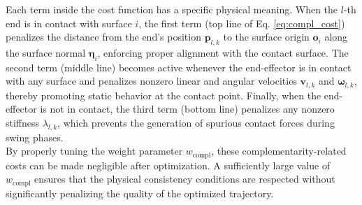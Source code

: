 \documentclass[main.tex]{subfiles}
\begin{document}
\begin{sloppypar}
\newline
Each term inside the cost function has a specific physical meaning. When the $l$-th end is in contact with surface $i$, the first term (top line of Eq. \ref{eq:compl_cost}) penalizes the distance from the end’s position $\mathbf{p}_{l,k}$ to the surface origin $\mathbf{o}_i$ along the surface normal $\boldsymbol{\eta}_i$, enforcing proper alignment with the contact surface. The second term (middle line) becomes active whenever the end-effector is in contact with any surface and penalizes nonzero linear and angular velocities $\mathbf{v}_{l,k}$ and $\boldsymbol{\omega}_{l,k}$, thereby promoting static behavior at the contact point. Finally, when the end-effector is not in contact, the third term (bottom line) penalizes any nonzero stiffness $\lambda_{l,k}$, which prevents the generation of spurious contact forces during swing phases. \\
By properly tuning the weight parameter $w_{\text{compl}}$, these complementarity-related costs can be made negligible after optimization. A sufficiently large value of $w_{\text{compl}}$ ensures that the physical consistency conditions are respected without significantly penalizing the quality of the optimized trajectory.

\end{sloppypar}
\end{document}
